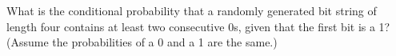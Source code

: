 \documentclass[../main.tex]{subfiles}
\begin{document}
What is the conditional probability that a randomly generated bit string of length four contains at least two consecutive 0s, given that the first bit is a 1?
(Assume the probabilities of a 0 and a 1 are the same.)

\solution
\end{document}
